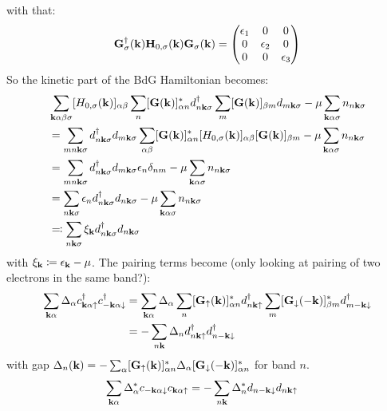 with that:
\begin{equation}
    \textbf{G}^{\dagger}_{\sigma} (\bm{\mathrm{k}}) \textbf{H}_{0, \sigma} (\bm{\mathrm{k}}) \textbf{G}_{\sigma} (\bm{\mathrm{k}}) =
    \begin{pmatrix}
        \epsilon_1 & 0 & 0 \\
        0 & \epsilon_2 & 0 \\
        0 & 0 & \epsilon_3
    \end{pmatrix}
\end{equation}
So the kinetic part of the BdG Hamiltonian becomes:
\begin{align}
    &\sum_{\bm{\mathrm{k}} \alpha \beta \sigma} [H_{0, \sigma} (\bm{\mathrm{k}})]_{\alpha \beta}
    \sum_{n} [\textbf{G} (\bm{\mathrm{k}})]_{\alpha n}^* d_{n \bm{\mathrm{k}} \sigma}^{\dagger}
    \sum_{m} [\textbf{G} (\bm{\mathrm{k}})]_{\beta m} d_{m \bm{\mathrm{k}} \sigma}
    -\mu \sum_{\bm{\mathrm{k}} \alpha \sigma} n_{n \bm{\mathrm{k}} \sigma} \\
    &= \sum_{m n \bm{\mathrm{k}} \sigma} d_{n \bm{\mathrm{k}} \sigma}^{\dagger} d_{m \bm{\mathrm{k}} \sigma}
   \sum_{\alpha \beta} [\textbf{G} (\bm{\mathrm{k}})]_{\alpha n}^* [H_{0, \sigma} (\bm{\mathrm{k}})]_{\alpha \beta} [\textbf{G} (\bm{\mathrm{k}})]_{\beta m}
    -\mu \sum_{\bm{\mathrm{k}} \alpha \sigma} n_{n \bm{\mathrm{k}} \sigma} \\
    &= \sum_{m n \bm{\mathrm{k}} \sigma} d_{n \bm{\mathrm{k}} \sigma}^{\dagger} d_{m \bm{\mathrm{k}} \sigma} \epsilon_{n} \delta_{n m}
    -\mu \sum_{\bm{\mathrm{k}} \alpha \sigma} n_{n \bm{\mathrm{k}} \sigma} \\
    &= \sum_{n \bm{\mathrm{k}} \sigma} \epsilon_{n} d_{n \bm{\mathrm{k}} \sigma}^{\dagger} d_{n \bm{\mathrm{k}} \sigma}
    -\mu \sum_{\bm{\mathrm{k}} \alpha \sigma} n_{n \bm{\mathrm{k}} \sigma} \\
    &\eqqcolon \sum_{n \bm{\mathrm{k}} \sigma} \xi_{\bm{\mathrm{k}}} d_{n \bm{\mathrm{k}} \sigma}^{\dagger} d_{n \bm{\mathrm{k}} \sigma}
\end{align}
with \(\xi_{\bm{\mathrm{k}}} \coloneqq \epsilon_{\bm{\mathrm{k}}} - \mu\).
The pairing terms become (only looking at pairing of two electrons in the same band?):
\begin{align}
    \sum_{\bm{\mathrm{k}} \alpha} \Delta_{\alpha} c_{\bm{\mathrm{k}} \alpha \uparrow}^{\dagger} c_{-\bm{\mathrm{k}} \alpha \downarrow}^{\dagger}
    &= \sum_{\bm{\mathrm{k}} \alpha} \Delta_{\alpha} \sum_n [\textbf{G}_{\uparrow} (\bm{\mathrm{k}})]_{\alpha n}^* d_{n \bm{\mathrm{k}} \uparrow}^{\dagger} \sum_m [\textbf{G}_{\downarrow} (-\bm{\mathrm{k}})]_{\beta m}^* d_{m -\bm{\mathrm{k}} \downarrow}^{\dagger} \\
    &= -\sum_{n \bm{\mathrm{k}}} \Delta_n d_{n \bm{\mathrm{k}} \uparrow}^{\dagger} d_{n -\bm{\mathrm{k}} \downarrow}^{\dagger}
\end{align}
with gap \(\Delta_n (\bm{\mathrm{k}}) = -\sum_{\alpha} [\textbf{G}_{\uparrow} (\bm{\mathrm{k}})]_{\alpha n}^* \Delta_{\alpha} [\textbf{G}_{\downarrow} (-\bm{\mathrm{k}})]_{\alpha n}^*\) for band \(n\).
\begin{align}
    \sum_{\bm{\mathrm{k}} \alpha} \Delta_{\alpha}^* c_{-\bm{\mathrm{k}} \alpha \downarrow} c_{\bm{\mathrm{k}} \alpha \uparrow}
    &= -\sum_{n \bm{\mathrm{k}}} \Delta_n^* d_{n -\bm{\mathrm{k}} \downarrow} d_{n \bm{\mathrm{k}} \uparrow}
\end{align}

